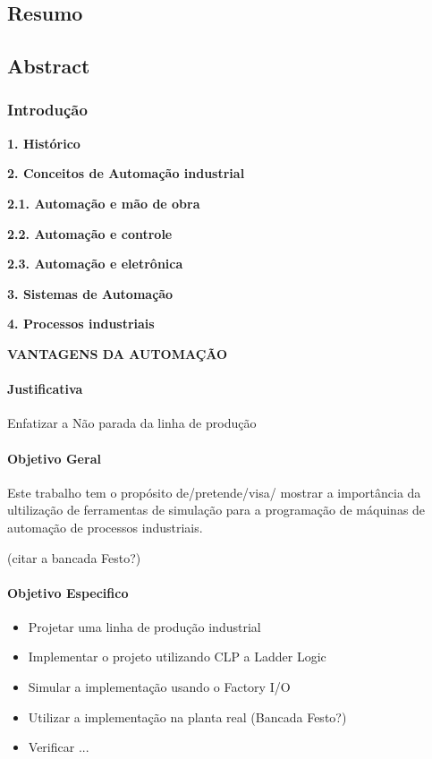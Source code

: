 \documentclass[a4paper, 12pt]{article}
\begin{document}
\begin{center}
	\part*{Resumo}
\end{center}

\begin{center}
	\part*{Abstract}
\end{center}

\section{Introdução}

\textbf{1. Histórico}

\textbf{2. Conceitos de Automação industrial}

\textbf{2.1. Automação e mão de obra}

\textbf{2.2. Automação e controle}

\textbf{2.3. Automação e eletrônica}

\textbf{3. Sistemas de Automação}

\textbf{4. Processos industriais}

\textbf{VANTAGENS DA AUTOMAÇÃO}

\subsection{Justificativa}

Enfatizar a Não parada da linha de produção

\subsection{Objetivo Geral}

Este trabalho tem o propósito de/pretende/visa/ mostrar a importância da 
ultilização de ferramentas de simulação para a programação de máquinas de
automação de processos industriais.

(citar a bancada Festo?)

\subsection{Objetivo Especifico}

\begin{itemize}
  \item Projetar uma linha de produção industrial
  \item Implementar o projeto utilizando CLP a Ladder Logic
  \item Simular a implementação usando o Factory I/O
  \item Utilizar a implementação na planta real (Bancada Festo?)
  \item Verificar ...
\end{itemize}
\end{document}
